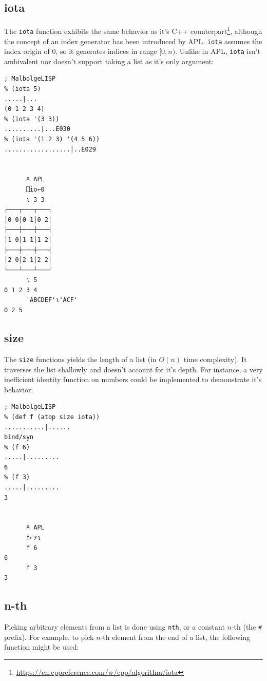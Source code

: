\subsection{iota}

\par The \verb|iota| function exhibits the same behavior as it's C++ counterpart\footnote{\url{https://en.cppreference.com/w/cpp/algorithm/iota}}, although the concept of an index generator has been introduced by APL. \verb|iota| assumes the index origin of 0, so it generates indices in range $[0, n)$. Unlike in APL, \verb|iota| isn't ambivalent nor doesn't support taking a list as it's only argument:

\begin{verbatim}
; MalbolgeLISP
% (iota 5)
.....|...
(0 1 2 3 4)
% (iota '(3 3))
..........|...E030
% (iota '(1 2 3) '(4 5 6))
..................|..E029


      ⍝ APL
      ⎕io←0
      ⍳ 3 3
┌───┬───┬───┐
│0 0│0 1│0 2│
├───┼───┼───┤
│1 0│1 1│1 2│
├───┼───┼───┤
│2 0│2 1│2 2│
└───┴───┴───┘
      ⍳ 5
0 1 2 3 4
      'ABCDEF'⍳'ACF'
0 2 5
\end{verbatim}

\subsection{size}

\par The \verb|size| functions yields the length of a list (in $O(n)$ time complexity). It traverses the list shallowly and doesn't account for it's depth. For instance, a very inefficient identity function on numbers could be implemented to demonstrate it's behavior:

\begin{verbatim}
; MalbolgeLISP
% (def f (atop size iota))
...........|......
bind/syn
% (f 6)
.....|.........
6
% (f 3)
.....|.........
3


      ⍝ APL
      f←≢⍳
      f 6
6
      f 3
3
\end{verbatim}

\subsection{n-th}

\par Picking arbitrary elements from a list is done using \verb|nth|, or a constant $n$-th (the \verb|#| prefix). For example, to pick $n$-th element from the end of a list, the following function might be used:

